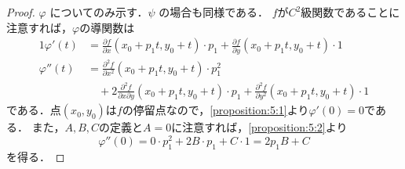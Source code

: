\documentclass[./index]{subfiles}
\begin{document}
\begin{proof}
    $\varphi$ についてのみ示す．$\psi$ の場合も同様である．
    $f$が$C^2$級関数であることに注意すれば，$\varphi$の導関数は
    \begin{alignat}{1}
        \varphi'(t)
        &=
              \frac{\partial f}{\partial x}(x_0 + p_1 t, y_0 + t) \cdot p_1
            + \frac{\partial f}{\partial y}(x_0 + p_1 t, y_0 + t) \cdot 1 \label{proposition:5:1} \\
        \varphi''(t)
        &=
              \frac{\partial^2 f}{\partial x^2}(x_0 + p_1 t, y_0 + t) \cdot p_1^2 \nonumber \\
        &\quad +
            2 \frac{\partial^2 f}{\partial x \partial y}(x_0 + p_1 t, y_0 + t) \cdot p_1
            + \frac{\partial^2 f}{\partial y^2}(x_0 + p_1 t, y_0 + t) \cdot 1 \label{proposition:5:2}
    \end{alignat}
    である．点$(x_0, y_0)$は$f$の停留点なので，\cref{proposition:5:1}より$\varphi'(0) = 0$である．
    また，$A, B, C$の定義と$A = 0$に注意すれば，\cref{proposition:5:2}より
    \begin{equation}
        \varphi''(0) = 0 \cdot p_1^2 + 2B \cdot p_1 + C \cdot 1 = 2p_1 B + C
    \end{equation}
    を得る．
\end{proof}
\end{document}
